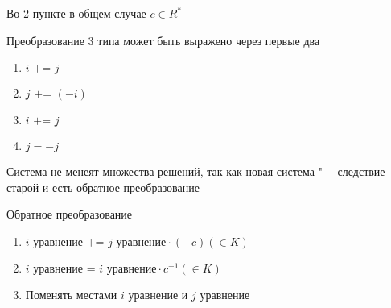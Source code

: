 \begin{Rem}
Во 2 пункте в общем случае $c \in R^*$
\end{Rem}
\begin{Rem}
Преобразование 3 типа может быть выражено через первые два

\begin{enumerate}
	\item $i \text{ += }  j$
	\item $j \text{ += }  (-i)$
	\item $i \text{ += }  j$
	\item $j = -j$
\end{enumerate}
\end{Rem}
\begin{Rem}
Система не менеят множества решений, так как новая система "--- следствие старой и есть обратное преобразование
\end{Rem}
\begin{Def}
Обратное преобразование

\begin{enumerate}
	\item $i \text{ уравнение += }  j \text{ уравнение} \cdot (-c) (\in K)$
	\item $i \text{ уравнение = }  i \text{ уравнение} \cdot c^{-1} (\in K)$
	\item Поменять местами $i$ уравнение и $j$ уравнение
\end{enumerate}
\end{Def}
